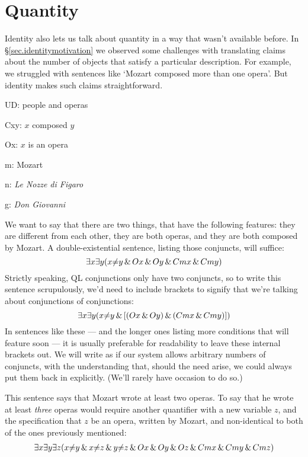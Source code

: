 \section{Quantity}
\label{sec.quantity}

Identity also lets us talk about quantity in a way that wasn't available before. In \S\ref{sec.identitymotivation} we observed some challenges with translating claims about the number of objects that satisfy a particular description. For example, we struggled with sentences like `Mozart composed more than one opera'. But identity makes such claims straightforward.

\begin{ekey}
\item[UD:] people and operas
\item[Cxy:] $x$ composed $y$
\item[Ox:] $x$ is an opera
\item[m:] Mozart
\item[n:] \emph{Le Nozze di Figaro}
\item[g:] \emph{Don Giovanni}
\end{ekey}

We want to say that there are two things, that have the following features: they are different from each other, they are both operas, and they are both composed by Mozart. A double-existential sentence, listing those conjuncts, will suffice: 
$$\exists x \exists y (x {\neq} y \,\&\, Ox \,\&\, Oy \,\&\, Cmx \,\&\, Cmy)$$
Strictly speaking, QL conjunctions only have two conjuncts, so to write this sentence scrupulously, we'd need to include brackets to signify that we're talking about conjunctions of conjunctions:
$$\exists x \exists y (x {\neq} y \,\&\, [(Ox \,\&\, Oy) \,\&\, (Cmx \,\&\, Cmy)])$$
In sentences like these --- and the longer ones listing more conditions that will feature soon --- it is usually preferable for readability to leave these internal brackets out. We will write as if our system allows arbitrary numbers of conjuncts, with the understanding that, should the need arise, we could always put them back in explicitly. (We'll rarely have occasion to do so.)

This sentence says that Mozart wrote at least two operas. To say that he wrote at least \emph{three} operas would require another quantifier with a new variable $z$, and the specification that $z$ be an opera, written by Mozart, and non-identical to both of the ones previously mentioned:
\begin{multline*}
\exists x \exists y \exists z (x {\neq} y \,\&\, x {\neq} z \,\&\, y {\neq} z \,\&\, 
Ox \,\&\, Oy \,\&\, Oz \,\&\, Cmx \,\&\, Cmy \,\&\, Cmz)
\end{multline*}

